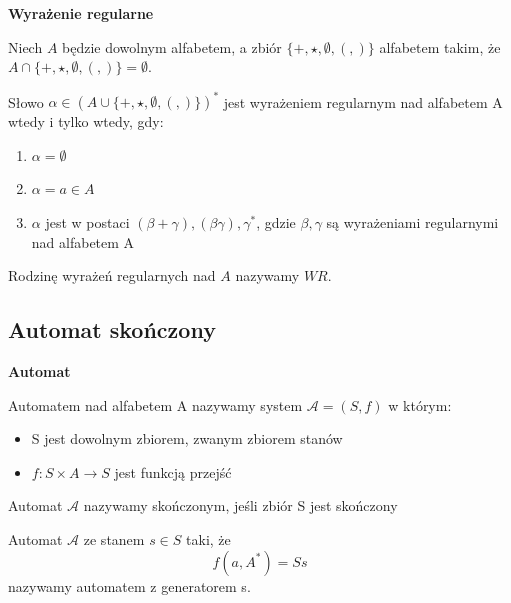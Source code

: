 \documentclass[12pt]{article}
\begin{document}
    \begin{definition}
        \textbf{Wyrażenie regularne}

        Niech $A$ będzie dowolnym alfabetem, a zbiór $\{+, \star, \emptyset, (,)\}$
        alfabetem takim, że $A \cap \{+, \star, \emptyset, (,)\} = \emptyset$.

        Słowo $\alpha \in (A \cup \{+, \star, \emptyset, (,)\})^*$ jest wyrażeniem regularnym
        nad alfabetem A wtedy i tylko wtedy, gdy:

        \begin{enumerate}
            \item $\alpha = \emptyset$
            \item $\alpha = a \in A$
            \item $\alpha$ jest w postaci $(\beta + \gamma), (\beta\gamma), \gamma^*$, gdzie
            $\beta, \gamma$ są wyrażeniami regularnymi nad alfabetem A
        \end{enumerate}
    \end{definition}

    Rodzinę wyrażeń regularnych nad $A$ nazywamy $WR$.

    \subsection{Automat skończony}

    \begin{definition}
        \textbf{Automat}

        Automatem nad alfabetem A nazywamy system $\mathcal{A} = (S, f)$ w którym:
        \begin{itemize}
            \item S jest dowolnym zbiorem, zwanym zbiorem stanów
            \item $f : S \times A \rightarrow S$ jest funkcją przejść
        \end{itemize}

        Automat $\mathcal{A}$ nazywamy skończonym, jeśli zbiór S jest skończony

        Automat $\mathcal{A}$ ze stanem $s \in S$ taki, że
        $$f(a, A^*) = Ss$$
        nazywamy automatem z generatorem s.
    \end{definition}
\end{document}
